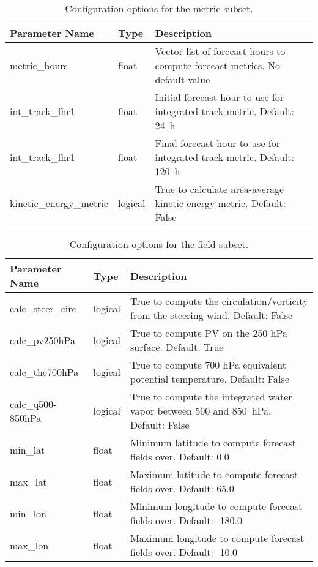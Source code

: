 \documentclass[psfig,12pt]{article}
\begin{document}
\begin{table}[H]
\caption{Configuration options for the metric subset.}
\begin{center}
\begin{tabular}{|p{1.25in}|p{0.5in}|p{4.5in}|}
\hline
Parameter Name & Type & Description \\ \hline \hline
metric\_hours & float & Vector list of forecast hours to compute forecast metrics.  No default value \\ \hline
int\_track\_fhr1 & float & Initial forecast hour to use for integrated track metric.  Default:  24~h \\ \hline
int\_track\_fhr1 & float & Final forecast hour to use for integrated track metric.  Default:  120~h \\ \hline
kinetic\_energy\_metric & logical & True to calculate area-average kinetic energy metric.
Default:  False \\ \hline
\end{tabular}
\end{center}
\end{table}

\begin{table}[H]
\caption{Configuration options for the field subset.}
\begin{center}
\begin{tabular}{|p{1.25in}|p{0.5in}|p{4.5in}|}
\hline
Parameter Name & Type & Description \\ \hline \hline
calc\_steer\_circ & logical & True to compute the circulation/vorticity from the steering wind.  
Default:  False \\ \hline
calc\_pv250hPa & logical & True to compute PV on the 250 hPa surface.  Default:  True \\ \hline
calc\_the700hPa & logical & True to compute 700 hPa equivalent potential temperature.  
Default:  False \\ \hline
calc\_q500-850hPa & logical & True to compute the integrated water vapor between 500 and 
850~hPa.  Default:  False \\ \hline
min\_lat & float & Minimum latitude to compute forecast fields over.  Default:  0.0 \\ \hline
max\_lat & float & Maximum latitude to compute forecast fields over.  Default:  65.0 \\ \hline
min\_lon & float & Minimum longitude to compute forecast fields over.  Default:  -180.0 \\ \hline
max\_lon & float & Maximum longitude to compute forecast fields over.  Default:  -10.0 \\ \hline
\end{tabular}
\end{center}
\end{table}
\end{document}

